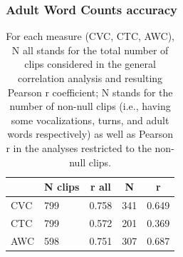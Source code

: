 \documentclass[english,table,man,floatsintext]{apa6}
\begin{document}
\hypertarget{adult-word-counts-accuracy}{%
\subsubsection{Adult Word Counts accuracy}\label{adult-word-counts-accuracy}}

\begin{table}[tbp]

\begin{center}
\begin{threeparttable}

\caption{\label{tab:tabrs}For each measure (CVC, CTC, AWC), N all stands for the total number of clips considered in the general correlation analysis and resulting Pearson r coefficient; N stands for the number of non-null clips (i.e., having some vocalizations, turns, and adult words respectively) as well as Pearson r in the analyses restricted to the non-null clips.}

\begin{tabular}{lllll}
\toprule
 & \multicolumn{1}{c}{N clips} & \multicolumn{1}{c}{r all} & \multicolumn{1}{c}{N} & \multicolumn{1}{c}{r}\\
\midrule
CVC & 799 & 0.758 & 341 & 0.649\\
CTC & 799 & 0.572 & 201 & 0.369\\
AWC & 598 & 0.751 & 307 & 0.687\\
\bottomrule
\end{tabular}

\end{threeparttable}
\end{center}

\end{table}
\end{document}

